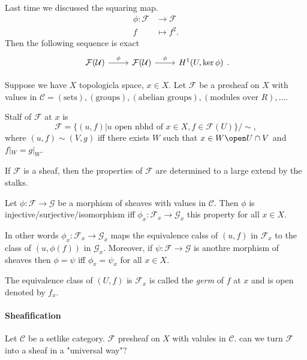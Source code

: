 \begin{erratum}
	Last time we discussed the squaring map. 
	\begin{align*}
		\phi: \mathcal{F}  &\longrightarrow \mathcal{F}  \\
		f &\longmapsto f^2
	.\end{align*}
	Then the following sequence is exact
	\[
	 \begin{tikzcd}
		 \mathcal{F(U)} \arrow[r, "\phi"] & \mathcal{ F(U)}  \arrow[r, "\phi"] & H^{1}(U, \ker \phi)
	 \end{tikzcd}
	.\] 
\end{erratum}

Suppose we have $X$ topologicla space, $x \in X$. Let $\mathcal{F} $ be a presheaf on $X$ with values in $\mathcal{C} = (\text{sets}), (\text{groups}), (\text{abelian groups}), (\text{modules over $R$}),  \ldots$. 

\begin{definition}
	Stalf of $\mathcal{F} $ at $x$ is \[
		\mathcal{F}  = \{(u, f)| u \text{ open nbhd of } x \in X, f \in \mathcal{F} (U)\} / \sim 
	,\] 
	where $(u, f) \sim (V, g)$ iff there exists  $W$ such that $x \in W \open U \cap V$ and $f|_W  = g|_W$. 
\end{definition}

If $\mathcal{F} $ is a sheaf, then the properties of $\mathcal{F} $ are determined to a large extend by the stalks.
\begin{example}
	Let $\phi: \mathcal{F} \to \mathcal{G} $ be a morphism of sheaves with values in $\mathcal{C} $. 
	Then $\phi $ is injective/surjective/isomorphism iff $\phi_x: \mathcal{F} _x \to \mathcal{G} _x$ this property for all $x \in X$.

	In other words  $\phi_x: \mathcal{F} _x \to \mathcal{G} _x$ maps the equivalence calss of $(u, f)$ in $\mathcal{F} _x$ to the class of $(u, \phi(f))$ in $\mathcal{G} _x$.
	Moreover, if $\psi: \mathcal{F}  \to \mathcal{G} $ is anothre morphism of sheaves then $\phi = \psi$ iff $\phi_x = \psi_x$ for all $x \in X$.
\end{example}
The equivalence class of $(U,f)$ is $\mathcal{F} _x$ is called the \emph{germ} of $f$ at $x$ and is open denoted by $f_x$.

\paragraph{Sheafification}
Let $\mathcal{C} $ be a setlike category. $\mathcal{F} $ presheaf on $X$ with valules in $\mathcal{C} $. can we turn $\mathcal{F} $ into a sheaf in a "universal way"?

